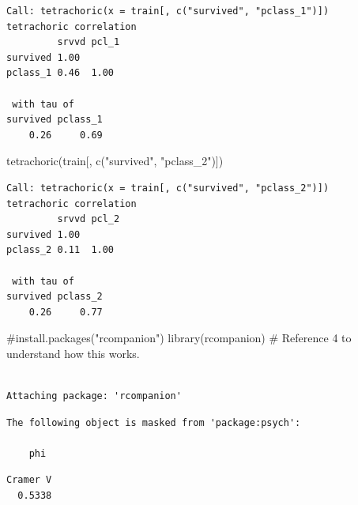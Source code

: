 \documentclass[
  letterpaper,
  DIV=11,
  numbers=noendperiod]{scrartcl}
\newenvironment{Shaded}{\begin{snugshade}}{\end{snugshade}}
\newcommand{\CommentTok}[1]{\textcolor[rgb]{0.37,0.37,0.37}{#1}}
\newcommand{\FunctionTok}[1]{\textcolor[rgb]{0.28,0.35,0.67}{#1}}
\newcommand{\NormalTok}[1]{\textcolor[rgb]{0.00,0.23,0.31}{#1}}
\newcommand{\SpecialCharTok}[1]{\textcolor[rgb]{0.37,0.37,0.37}{#1}}
\newcommand{\StringTok}[1]{\textcolor[rgb]{0.13,0.47,0.30}{#1}}
\begin{document}
\begin{verbatim}
Call: tetrachoric(x = train[, c("survived", "pclass_1")])
tetrachoric correlation 
         srvvd pcl_1
survived 1.00       
pclass_1 0.46  1.00 

 with tau of 
survived pclass_1 
    0.26     0.69 
\end{verbatim}

\begin{Shaded}
\begin{Highlighting}[]
\FunctionTok{tetrachoric}\NormalTok{(train[, }\FunctionTok{c}\NormalTok{(}\StringTok{"survived"}\NormalTok{, }\StringTok{"pclass\_2"}\NormalTok{)])}
\end{Highlighting}
\end{Shaded}

\begin{verbatim}
Call: tetrachoric(x = train[, c("survived", "pclass_2")])
tetrachoric correlation 
         srvvd pcl_2
survived 1.00       
pclass_2 0.11  1.00 

 with tau of 
survived pclass_2 
    0.26     0.77 
\end{verbatim}

\begin{Shaded}
\begin{Highlighting}[]
\CommentTok{\#install.packages("rcompanion")}
\FunctionTok{library}\NormalTok{(rcompanion) }\CommentTok{\# Reference 4 to understand how this works.}
\end{Highlighting}
\end{Shaded}

\begin{verbatim}

Attaching package: 'rcompanion'
\end{verbatim}

\begin{verbatim}
The following object is masked from 'package:psych':

    phi
\end{verbatim}

\begin{Shaded}
\end{Shaded}

\begin{verbatim}
Cramer V 
  0.5338 
\end{verbatim}
\end{document}

